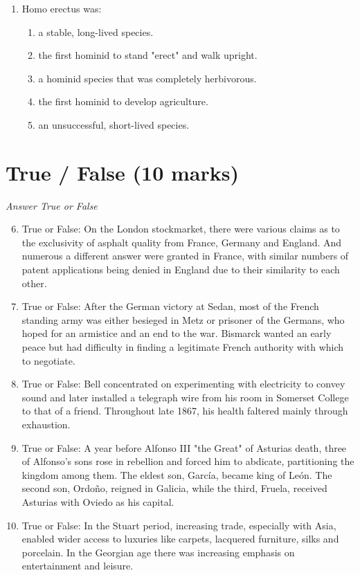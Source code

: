 \documentclass[12pt]{article}
\begin{document}
\begin{enumerate}[label=\arabic*.]
\begin{enumerate}[label=(\alph*)]
    \item office; landfill
    \item dining area; garbage disposal
    \item bathroom; incinerator
    \item kitchen; garden
    \item playground; waste treatment plant
\end{enumerate}
\item Homo erectus was:
\begin{enumerate}[label=(\alph*)]
    \item a stable, long-lived species.
    \item the first hominid to stand "erect" and walk upright.
    \item a hominid species that was completely herbivorous.
    \item the first hominid to develop agriculture.
    \item an unsuccessful, short-lived species.
\end{enumerate}
\end{enumerate}

\section*{True / False (10 marks)}
\textit{Answer True or False}
\begin{enumerate}[label=\arabic*.]
\setcounter{enumi}{5}
\item True or False: On the London stockmarket, there were various claims as to the exclusivity of asphalt quality from France, Germany and England. And numerous a different answer were granted in France, with similar numbers of patent applications being denied in England due to their similarity to each other.
\item True or False: After the German victory at Sedan, most of the French standing army was either besieged in Metz or prisoner of the Germans, who hoped for an armistice and an end to the war. Bismarck wanted an early peace but had difficulty in finding a legitimate French authority with which to negotiate.
\item True or False: Bell concentrated on experimenting with electricity to convey sound and later installed a telegraph wire from his room in Somerset College to that of a friend. Throughout late 1867, his health faltered mainly through exhaustion.
\item True or False: A year before Alfonso III "the Great" of Asturias death, three of Alfonso's sons rose in rebellion and forced him to abdicate, partitioning the kingdom among them. The eldest son, García, became king of León. The second son, Ordoño, reigned in Galicia, while the third, Fruela, received Asturias with Oviedo as his capital.
\item True or False: In the Stuart period, increasing trade, especially with Asia, enabled wider access to luxuries like carpets, lacquered furniture, silks and porcelain. In the Georgian age there was increasing emphasis on entertainment and leisure.
\end{enumerate}
\end{document}
